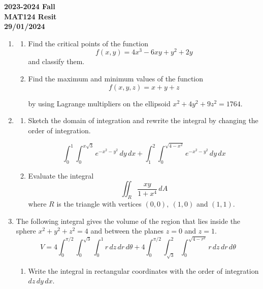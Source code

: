 \documentclass[a4paper, 12pt]{article}
\begin{document}
\newpage
{}
{}

\begin{center}
\textbf{2023-2024 Fall \\MAT124 Resit\\29/01/2024}
\end{center}

\begin{enumerate}[leftmargin=*,label=\textbf{\arabic*.}]
\item \begin{enumerate}[leftmargin=*,label=\textbf{\alph*.}]
\item Find the critical points of the function
\[f(x,y)=4x^3-6xy+y^2+2y\]
and classify them.

\item Find the maximum and minimum values of the function
\[f(x,y,z)=x+y+z\]

by using Lagrange multipliers on the ellipsoid $x^2+4y^2+9z^2=1764$.
\end{enumerate}

\item \begin{enumerate}[leftmargin=*,label=\textbf{\alph*.}]
\item Sketch the domain of integration and rewrite the integral by changing the order of integration.

\[\int_0^1\int_0^{x\sqrt3}{e}^{-x^2-y^2}\,dy\,dx+\int_1^2\int_0^{\sqrt{4-x^2}}{e}^{-x^2-y^2}\,dy\,dx\]

\item Evaluate the integral
\[\iint_R\frac{xy}{1+x^4}\,dA\]
where $R$ is the triangle with vertices $(0,0),\:(1,0)$ and $(1,1)$.

\end{enumerate}

\item The following integral gives the volume of the region that lies inside the sphere $x^2+y^2+z^2=4$ and between the planes $z=0$ and $z=1$.
\[V=4\int_0^{\pi/2}\int_0^{\sqrt3}\int_0^1r\,dz\,dr\,d\theta+4\int_0^{\pi/2}\int_{\sqrt3}^2\int_0^{\sqrt{4-r^2}}r\,dz\,dr\,d\theta\]

\begin{enumerate}[leftmargin=*,label=\textbf{\alph*.}]
\item Write the integral in rectangular coordinates with the order of integration $dz\,dy\,dx$.


\end{enumerate}
\end{enumerate}
\end{document}
